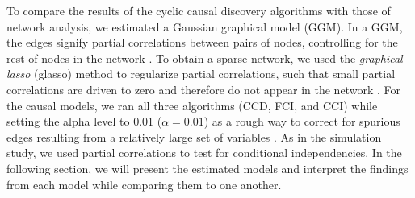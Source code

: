 \documentclass[twoside, 11pt]{article}
\begin{document}
To compare the results of the cyclic causal discovery algorithms with those of network analysis, we estimated a Gaussian graphical model (GGM). In a GGM, the edges signify partial correlations between pairs of nodes, controlling for the rest of nodes in the network \citep{epskamp_gaussian_2018}. To obtain a sparse network, we used the \textit{graphical lasso} (glasso) method to regularize partial correlations, such that small partial correlations are driven to zero and therefore do not appear in the network \citep{friedman_sparse_2008}. For the causal models, we ran all three algorithms (CCD, FCI, and CCI) while setting the alpha level to 0.01 ($\alpha = 0.01$) as a rough way to correct for spurious edges resulting from a relatively large set of variables \citep{zhang_kernel-based_2012}. As in the simulation study, we used partial correlations to test for conditional independencies. 
In the following section, we will present the estimated models and interpret the findings from each model while comparing them to one another.

\restoregeometry

\end{document}
